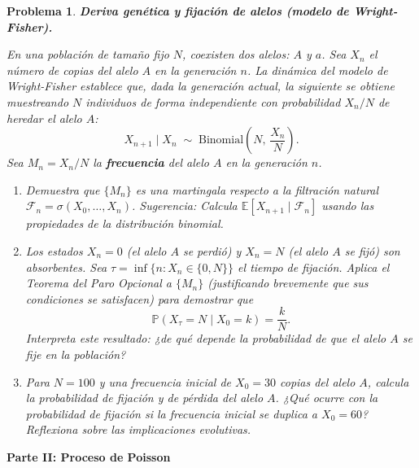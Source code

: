 \documentclass[12pt]{article}
\newtheorem{problem}{Problema}
\begin{document}
\begin{problem}
\textbf{Deriva genética y fijación de alelos (modelo de Wright-Fisher).}

En una población de tamaño fijo $N$, coexisten dos alelos: $A$ y $a$. Sea $X_n$ el número de copias del alelo $A$ en la generación $n$. La dinámica del modelo de Wright-Fisher establece que, dada la generación actual, la siguiente se obtiene muestreando $N$ individuos de forma independiente con probabilidad $X_n/N$ de heredar el alelo $A$:
\[
    X_{n+1} \mid X_n \;\sim\; \mathrm{Binomial}\!\left(N,\, \frac{X_n}{N}\right).
\]
Sea $M_n = X_n / N$ la \textbf{frecuencia} del alelo $A$ en la generación $n$.

\begin{enumerate}
    \item[(a)] Demuestra que $\{M_n\}$ es una martingala respecto a la filtración natural $\mathcal{F}_n = \sigma(X_0, \ldots, X_n)$. \textit{Sugerencia:} Calcula $\mathbb{E}[X_{n+1} \mid \mathcal{F}_n]$ usando las propiedades de la distribución binomial.

    \item[(b)] Los estados $X_n = 0$ (el alelo $A$ se perdió) y $X_n = N$ (el alelo $A$ se fijó) son absorbentes. Sea $\tau = \inf\{n : X_n \in \{0, N\}\}$ el tiempo de fijación. Aplica el Teorema del Paro Opcional a $\{M_n\}$ (justificando brevemente que sus condiciones se satisfacen) para demostrar que
    \[
        \mathbb{P}(X_\tau = N \mid X_0 = k) = \frac{k}{N}.
    \]
    Interpreta este resultado: ¿de qué depende la probabilidad de que el alelo $A$ se fije en la población?

    \item[(c)] Para $N = 100$ y una frecuencia inicial de $X_0 = 30$ copias del alelo $A$, calcula la probabilidad de fijación y de pérdida del alelo $A$. ¿Qué ocurre con la probabilidad de fijación si la frecuencia inicial se duplica a $X_0 = 60$? Reflexiona sobre las implicaciones evolutivas.
\end{enumerate}
\end{problem}

\bigskip

\noindent\textbf{\large Parte II: Proceso de Poisson}

\bigskip
\end{document}
